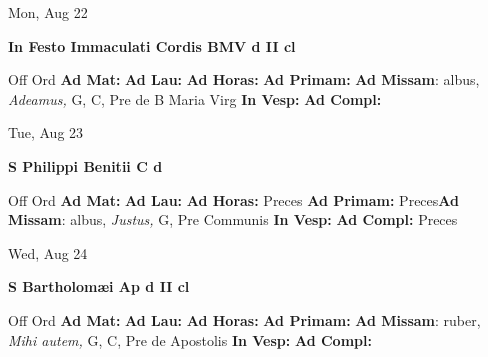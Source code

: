 \documentclass[10pt]{memoir}
\begin{document}
\begin{center}
\begin{minipage}{3.5in}
\vspace{2em}
\begin{center}Mon, Aug 22
\end{center}
\textbf{ \large In Festo Immaculati Cordis BMV
\textnormal{\normalsize d II cl}}

\begin{justify}Off Ord
\textbf{Ad Mat: }
\textbf{Ad Lau: }
\textbf{Ad Horas: }
\textbf{Ad Primam: }\textbf{Ad Missam}: albus, \textit{Adeamus,} G, C, Pre de B Maria Virg
\textbf{In Vesp: }
\textbf{Ad Compl: }
\end{justify}
\end{minipage}
\end{center}

\begin{center}
\begin{minipage}{3.5in}
\vspace{2em}
\begin{center}Tue, Aug 23
\end{center}
\textbf{ \large S Philippi Benitii C
\textnormal{\normalsize d}}

\begin{justify}Off Ord
\textbf{Ad Mat: }
\textbf{Ad Lau: }
\textbf{Ad Horas: }Preces
\textbf{Ad Primam: }Preces\textbf{Ad Missam}: albus, \textit{Justus,} G, Pre Communis
\textbf{In Vesp: }
\textbf{Ad Compl: }Preces
\end{justify}
\end{minipage}
\end{center}

\begin{center}
\begin{minipage}{3.5in}
\vspace{2em}
\begin{center}Wed, Aug 24
\end{center}
\textbf{ \large S Bartholomæi Ap
\textnormal{\normalsize d II cl}}

\begin{justify}Off Ord
\textbf{Ad Mat: }
\textbf{Ad Lau: }
\textbf{Ad Horas: }
\textbf{Ad Primam: }\textbf{Ad Missam}: ruber, \textit{Mihi autem,} G, C, Pre de Apostolis
\textbf{In Vesp: }
\textbf{Ad Compl: }
\end{justify}
\end{minipage}
\end{center}
\end{document}
